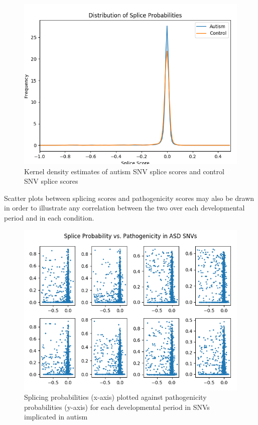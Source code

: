 \documentclass[12pt]{article}
\begin{document}
\begin{figure}[ht]
\centering
    \includegraphics[width=\textwidth,height=\textheight,keepaspectratio]{../analysis/splice_distributions.png}
    \caption{Kernel density estimates of autism SNV splice scores and control SNV splice scores}
\end{figure}

\pagebreak

Scatter plots between splicing scores and pathogenicity scores
may also be drawn in order to illustrate any correlation between the two over
each developmental period and in each condition.

\begin{figure}[ht]
\centering
    \includegraphics[width=\textwidth,height=\textheight,keepaspectratio]{../analysis/pos_corr.png}
    \caption{Splicing probabilities (x-axis) plotted against pathogenicity probabilities (y-axis) for each developmental period in SNVs implicated in autism}
\end{figure}
\end{document}

